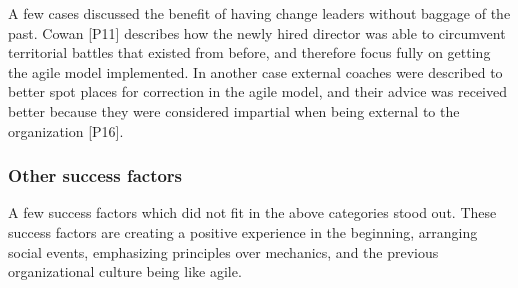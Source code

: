 \documentclass[preprint,authoryear,12pt]{elsarticle}
\begin{document}

A few cases discussed the benefit of having change leaders without baggage of
the past. Cowan [P11] describes how the newly hired director was able to
circumvent territorial battles that existed from before, and therefore focus
fully on getting the agile model implemented. In another case external coaches
were described to better spot places for correction in the agile model, and
their advice was received better because they were considered impartial when
being external to the organization [P16].


% 
% 
% 
% 
% 


\subsubsection{Other success factors}

A few success factors which did not fit in the above categories stood out. These
success factors are creating a positive experience in the beginning, arranging
social events, emphasizing principles over mechanics, and the previous
organizational culture being like agile.

\end{document}
